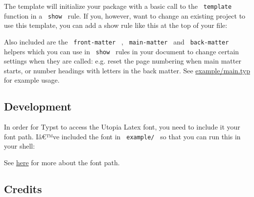 The template will initialize your package with a basic call to the
\texttt{\ template\ } function in a \texttt{\ show\ } rule. If you,
however, want to change an existing project to use this template, you
can add a show rule like this at the top of your file:

\begin{Shaded}
\begin{Highlighting}[]

\NormalTok{)}

\end{Highlighting}
\end{Shaded}

Also included are the \texttt{\ front-matter\ } ,
\texttt{\ main-matter\ } and \texttt{\ back-matter\ } helpers which you
can use in \texttt{\ show\ } rules in your document to change certain
settings when they are called: e.g. reset the page numbering when main
matter starts, or number headings with letters in the back matter. See
\href{https://github.com/augustebaum/epfl-thesis-typst/blob/v0.1.2/example/main.typ}{example/main.typ}
for example usage.

\subsection{Development}\label{development}

In order for Typst to access the Utopia Latex font, you need to include
it your font path. Iâ€™ve included the font in \texttt{\ example/\ } so
that you can run this in your shell:

\begin{Shaded}
\begin{Highlighting}[]
\end{Highlighting}
\end{Shaded}

See
\href{https://typst.app/docs/reference/text/text/\#parameters-font}{here}
for more about the font path.

\subsection{Credits}\label{credits}

